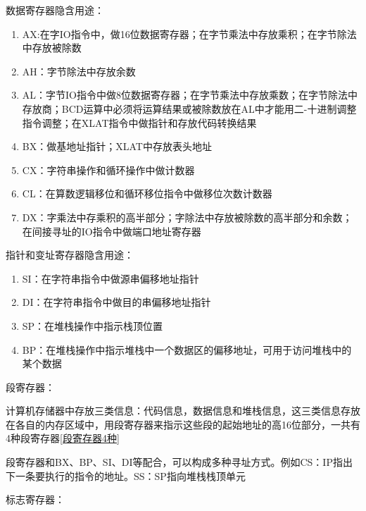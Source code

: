 数据寄存器隐含用途：
\begin{enumerate}
    \item AX:在字IO指令中，做16位数据寄存器；在字节乘法中存放乘积；在字节除法中存放被除数
    \item AH：字节除法中存放余数
    \item AL：字节IO指令中做8位数据寄存器；在字节乘法中存放乘数；在字节除法中存放商；BCD运算中必须将运算结果或被除数放在AL中才能用二-十进制调整指令调整；在XLAT指令中做指针和存放代码转换结果
    \item BX：做基地址指针；XLAT中存放表头地址
    \item CX：字符串操作和循环操作中做计数器
    \item CL：在算数逻辑移位和循环移位指令中做移位次数计数器
    \item DX：字乘法中存乘积的高半部分；字除法中存放被除数的高半部分和余数；在间接寻址的IO指令中做端口地址寄存器
\end{enumerate}
指针和变址寄存器隐含用途：
\begin{enumerate}
    \item SI：在字符串指令中做源串偏移地址指针
    \item DI：在字符串指令中做目的串偏移地址指针
    \item SP：在堆栈操作中指示栈顶位置
    \item BP：在堆栈操作中指示堆栈中一个数据区的偏移地址，可用于访问堆栈中的某个数据
\end{enumerate}
段寄存器：

计算机存储器中存放三类信息：代码信息，数据信息和堆栈信息，这三类信息存放在各自的内存区域中，用段寄存器来指示这些段的起始地址的高16位部分，一共有4种段寄存器\ref{段寄存器4种}

段寄存器和BX、BP、SI、DI等配合，可以构成多种寻址方式。例如CS：IP指出下一条要执行的指令的地址。SS：SP指向堆栈栈顶单元

标志寄存器：


